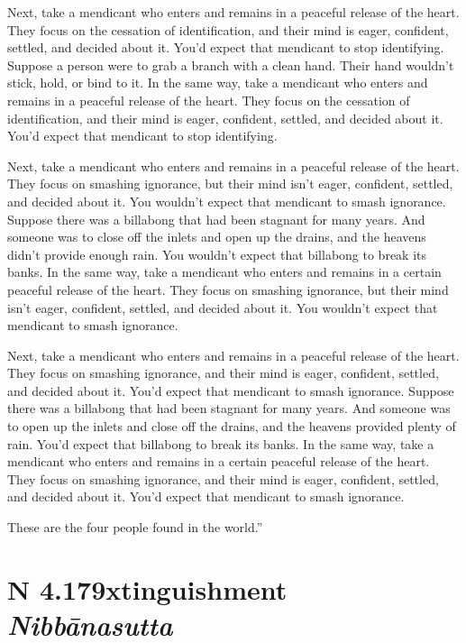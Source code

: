\documentclass[12pt,openany]{book}%
\newcommand*{\suttatitleacronym}[1]{\smaller[2]{#1}\vspace*{.3em}}
\newcommand*{\suttatitletranslation}[1]{\linebreak{#1}}
\newcommand*{\suttatitleroot}[1]{\linebreak\smaller[2]\itshape{#1}}
\newcommand*{\tocacronym}[1]{\hspace*{-3.3em}{#1}\quad}
\newcommand*{\toctranslation}[1]{#1}
\newcommand*{\tocroot}[1]{(\textit{#1})}
\begin{document}
Next, take a mendicant who enters and remains in a peaceful release of the heart. They focus on the cessation of identification, and their mind is eager, confident, settled, and decided about it. You’d expect that mendicant to stop identifying. Suppose a person were to grab a branch with a clean hand. Their hand wouldn’t stick, hold, or bind to it. In the same way, take a mendicant who enters and remains in a peaceful release of the heart. They focus on the cessation of identification, and their mind is eager, confident, settled, and decided about it. You’d expect that mendicant to stop identifying. 

Next, take a mendicant who enters and remains in a peaceful release of the heart. They focus on smashing ignorance, but their mind isn’t eager, confident, settled, and decided about it. You wouldn’t expect that mendicant to smash ignorance. Suppose there was a billabong that had been stagnant for many years. And someone was to close off the inlets and open up the drains, and the heavens didn’t provide enough rain. You wouldn’t expect that billabong to break its banks. In the same way, take a mendicant who enters and remains in a certain peaceful release of the heart. They focus on smashing ignorance, but their mind isn’t eager, confident, settled, and decided about it. You wouldn’t expect that mendicant to smash ignorance. 

Next, take a mendicant who enters and remains in a peaceful release of the heart. They focus on smashing ignorance, and their mind is eager, confident, settled, and decided about it. You’d expect that mendicant to smash ignorance. Suppose there was a billabong that had been stagnant for many years. And someone was to open up the inlets and close off the drains, and the heavens provided plenty of rain. You’d expect that billabong to break its banks. In the same way, take a mendicant who enters and remains in a certain peaceful release of the heart. They focus on smashing ignorance, and their mind is eager, confident, settled, and decided about it. You’d expect that mendicant to smash ignorance. 

These are the four people found in the world.” 

%
\section*{{\suttatitleacronym AN 4.179}{\suttatitletranslation Extinguishment }{\suttatitleroot Nibbānasutta}}
\addcontentsline{toc}{section}{\tocacronym{AN 4.179} \toctranslation{Extinguishment } \tocroot{Nibbānasutta}}
\end{document}

